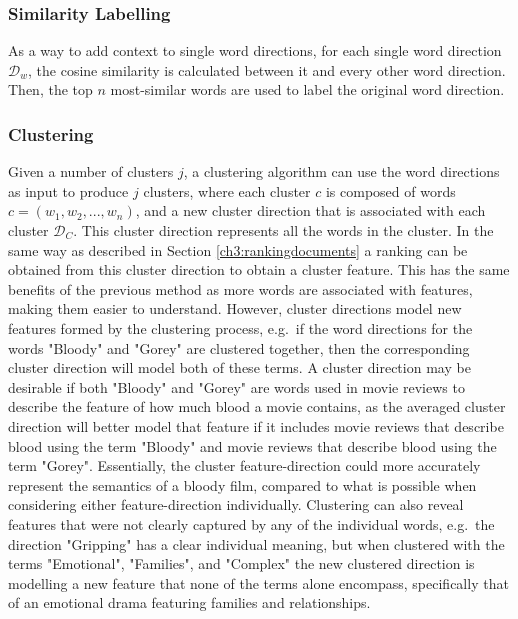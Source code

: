 \subsubsection{Similarity Labelling}\label{ch3:simlabel} 

As a way to add context to single word directions, for each single word direction $\mathcal{D}_w$, the cosine similarity is calculated between it and every other word direction. Then, the top $n$ most-similar words are used to label the original word direction.  %

\subsubsection{Clustering}\label{ch3:clustering}
Given a number of clusters $j$, a clustering algorithm can use the word directions as input to  produce $j$ clusters, where each cluster $c$ is composed of words $c =  (w_1, w_2, ..., w_n)$, and a new cluster direction that is associated with each cluster  $\mathcal{D}_C$. This cluster direction  represents all the words in the cluster. In the same way as described in Section \ref{ch3:rankingdocuments} a ranking can be obtained from this cluster direction to obtain a cluster feature. %
This has the same  benefits of the previous method as more words are associated with features, making them easier to understand. However, cluster directions model new features formed by the clustering process, e.g.\  if the word directions for the words "Bloody" and "Gorey" are clustered together, then the corresponding cluster direction will model both of these terms. A cluster direction may be desirable if both "Bloody" and "Gorey" are words used in movie reviews to describe the feature of how much blood a movie contains, as the  averaged cluster direction will better model that feature  if it includes movie reviews that describe blood using the term "Bloody" and movie reviews that describe blood using the term "Gorey".  Essentially, the cluster feature-direction could more accurately represent the semantics of a bloody  film, compared to what is possible when considering either feature-direction individually. Clustering can also reveal features that were not clearly captured by any of the individual words, e.g.\ the direction  "Gripping" has a clear individual meaning, but when clustered with the terms  "Emotional", "Families", and "Complex" the new clustered direction is modelling a new feature that none of the terms alone encompass, specifically that of an emotional drama featuring families and relationships.



